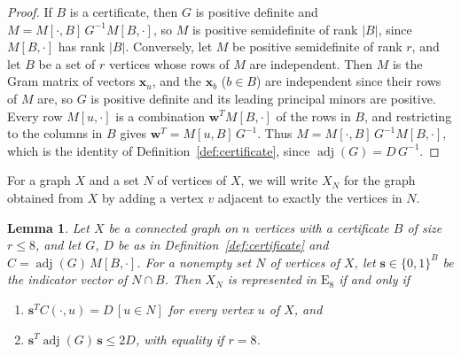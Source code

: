\documentclass[11pt]{article}
\newcommand\Zw{{\mathbf w}}
\newcommand\Zx{{\mathbf x}}
\newcommand\inv{^{-1}}
\newtheorem{lemma}[theorem]{Lemma}
\theoremstyle{definition}
\newcommand{\typ}[1]{\mathrm{#1}}
\newcommand\Zs{{\mathbf s}}
\begin{document}
\begin{proof}
If $B$ is a certificate, then $G$ is positive definite and $M=M[\cdot,B]\,G\inv M[B,\cdot]$, so
$M$ is positive semidefinite of rank $\lvert B\rvert$, since $M[B,\cdot]$ has rank $\lvert
B\rvert$. Conversely, let $M$ be positive semidefinite of rank $r$, and let $B$ be a set of $r$
vertices whose rows of $M$ are independent. Then $M$ is the Gram matrix of vectors $\Zx_u$, and
the $\Zx_b$ ($b\in B$) are independent since their rows of $M$ are, so $G$ is positive definite
and its leading principal minors are positive. Every row $M[u,\cdot]$ is a combination
$\Zw^TM[B,\cdot]$ of the rows in $B$, and restricting to the columns in $B$ gives
$\Zw^T=M[u,B]\,G\inv$. Thus $M=M[\cdot,B]\,G\inv M[B,\cdot]$, which is the identity of
Definition~\ref{def:certificate}, since $\operatorname{adj}(G)=D\,G\inv$.
\end{proof}

For a graph $X$ and a set $N$ of vertices of $X$, we will write $X_N$ for the graph obtained from
$X$ by adding a vertex $v$ adjacent to exactly the vertices in $N$.

\begin{lemma}\label{lem:extension}
Let $X$ be a connected graph on $n$ vertices with a certificate $B$ of size $r\le8$, and let $G$,
$D$ be as in Definition~\ref{def:certificate} and $C=\operatorname{adj}(G)\,M[B,\cdot]$. For a
nonempty set $N$ of vertices of $X$, let $\Zs\in\{0,1\}^B$ be the indicator vector of
$N\cap B$. Then $X_N$ is represented in $\typ E_8$ if and only if
\begin{enumerate}
\item $\Zs^TC(\cdot,u)=D\,[u\in N]$ for every vertex $u$ of $X$, and
\item $\Zs^T\operatorname{adj}(G)\,\Zs\le2D$, with equality if $r=8$.
\end{enumerate}
\end{lemma}
\end{document}
